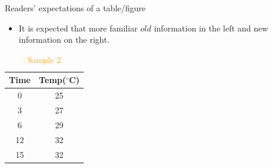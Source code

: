 \documentclass[
 size=14pt,
 paper=smartboard,  %
 mode=present, 		%
 display=slides, 	%
 style=tuliplab,  	%
 pauseslide,
 fleqn,leqno]{powerdot}{}
\begin{document}
\begin{slide}[toc=,bm=]{Readers’ expectations of a table/figure}
	\begin{itemize}
		\item It is expected that more familiar \(old\) information in the left and new information on the right.
	\end{itemize}

{
	\begin{table}
	\fontsize{11pt}{11pt}\selectfont
	\setlength{\abovecaptionskip}{0pt}
	\setlength{\belowcaptionskip}{12pt}
	\centering
	\caption{\textcolor{orange}{Sample 2}}
		\begin{tabular}{c|c}
				\toprule
				 \textbf{Time} & \textbf{Temp($^\circ$C)}\\ 
				\midrule
				 0  & 25 \\
				 3  & 27 \\
				 6  & 29 \\
				 12  & 32 \\
				 15  & 32 \\
				\bottomrule
		\end{tabular}
	\end{table}
}
\end{slide}

\end{document}
